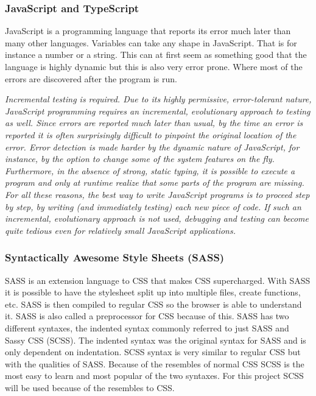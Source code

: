 \subsubsection{JavaScript and TypeScript}%
\label{ssub:JavaScript and TypeScript}

JavaScript is a programming language that reports its error much later than many other languages. Variables can take any shape in JavaScript. That is for instance a number or a string. This can at first seem as something good that the language is highly dynamic but this is also very error prone. Where most of the errors are discovered after the program is run. 

\textit{Incremental testing is required. Due to its highly permissive, error-tolerant nature, JavaScript programming requires an incremental, evolutionary approach to testing as well. Since errors are reported much later than usual, by the time an error is reported it is often surprisingly difficult to pinpoint the original location of the error. Error detection is made harder by the dynamic nature of JavaScript, for instance, by the option to change some of the system features on the fly. Furthermore, in the absence of strong, static typing, it is possible to execute a program and only at runtime realize that some parts of the program are missing. For all these reasons, the best way to write JavaScript programs is to proceed step by step, by writing (and immediately testing) each new piece of code. If such an incremental, evolutionary approach is not used, debugging and testing can become quite tedious even for relatively small JavaScript applications.} \cite{taivalsaari2008web} 


\subsubsection{Syntactically Awesome Style Sheets (SASS)}%
\label{sub:sass}
SASS is an extension language to CSS that makes CSS supercharged. With SASS it is possible to have the stylesheet split up into multiple files, create functions, etc. SASS is then compiled to regular CSS so the browser is able to understand it. SASS is also called a preprocessor for CSS because of this.  SASS has two different syntaxes, the indented syntax commonly referred to just SASS and Sassy CSS (SCSS). The indented syntax was the original syntax for SASS and is only dependent on indentation. SCSS syntax is very similar to regular CSS but with the qualities of SASS. Because of the resembles of normal CSS SCSS is the most easy to learn and most popular of the two syntaxes. For this project SCSS will be used because of the resembles to CSS.

